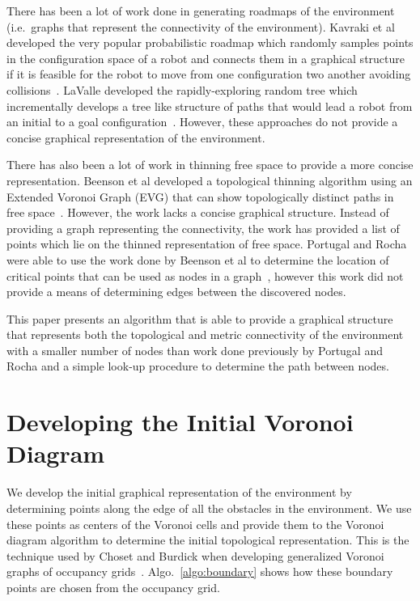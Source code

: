 \documentclass[letterpaper, 10pt, conference]{ieeeconf}
\begin{document}
There has been a lot of work done in generating roadmaps of the environment
(i.e.\ graphs that represent the connectivity of the environment). Kavraki et
al developed the very popular probabilistic roadmap which randomly samples
points in the configuration space of a robot and connects them in a graphical
structure if it is feasible for the robot to move from one configuration two
another avoiding collisions~\cite{prm}. LaValle developed the rapidly-exploring
random tree which incrementally develops a tree like structure of paths that
would lead a robot from an initial to a goal configuration~\cite{rrt}. However,
these approaches do not provide a concise graphical representation of the
environment.

There has also been a lot of work in thinning free space to provide a more
concise representation. Beenson et al developed a topological thinning
algorithm using an Extended Voronoi Graph (EVG) that can show topologically
distinct paths in free space~\cite{evg}. However, the work lacks a concise
graphical structure.  Instead of providing a graph representing the
connectivity, the work has provided a list of points which lie on the thinned
representation of free space. Portugal and Rocha were able to use the work done
by Beenson et al to determine the location of critical points that can be used
as nodes in a graph~\cite{david}, however this work did not provide a means of
determining edges between the discovered nodes.

This paper presents an algorithm that is able to provide a graphical structure
that represents both the topological and metric connectivity of the environment
with a smaller number of nodes than work done previously by Portugal and Rocha
and a simple look-up procedure to determine the path between nodes.

\section{Developing the Initial Voronoi Diagram}

We develop the initial graphical representation of the environment by
determining points along the edge of all the obstacles in the environment. We
use these points as centers of the Voronoi cells and provide them to the
Voronoi diagram algorithm to determine the initial topological representation.
This is the technique used by Choset and Burdick when developing generalized
Voronoi graphs of occupancy grids~\cite{choset2000sensor}.
Algo.~\ref{algo:boundary} shows how these boundary points are chosen from the
occupancy grid.
\end{document}
